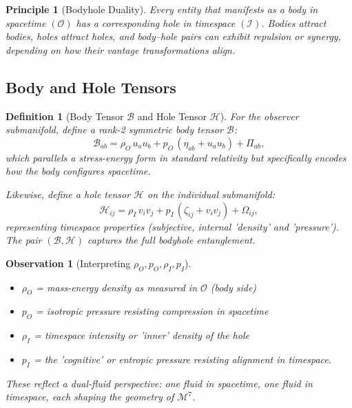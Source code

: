 \documentclass{article}
\newtheorem{definition}{Definition}
\newtheorem{observation}{Observation}
\newtheorem{principle}{Principle}
\begin{document}
\begin{principle}[Bodyhole Duality]
Every entity that manifests as a \emph{body} in spacetime $(\mathcal{O})$ has a corresponding \emph{hole} in timespace $(\mathcal{I})$. Bodies attract bodies, holes attract holes, and body--hole pairs can exhibit repulsion or synergy, depending on how their vantage transformations align.
\end{principle}

\subsection*{Body and Hole Tensors}

\begin{definition}[Body Tensor $\mathcal{B}$ and Hole Tensor $\mathcal{H}$]
For the observer submanifold, define a rank-2 symmetric \emph{body} tensor $\mathcal{B}$:
\begin{equation}
\mathcal{B}_{ab} = \rho_O\,u_a u_b + p_O\,(\eta_{ab}+u_a u_b) + \Pi_{ab},
\end{equation}
which parallels a stress-energy form in standard relativity but specifically encodes how the body configures spacetime.

Likewise, define a \emph{hole} tensor $\mathcal{H}$ on the individual submanifold:
\begin{equation}
\mathcal{H}_{ij} = \rho_I\,v_i v_j + p_I\,(\zeta_{ij} + v_i v_j) + \Omega_{ij},
\end{equation}
representing timespace properties (subjective, internal 'density' and 'pressure'). The pair $(\mathcal{B}, \mathcal{H})$ captures the full bodyhole entanglement.
\end{definition}

\begin{observation}[Interpreting $\rho_O, p_O, \rho_I, p_I$]
\begin{itemize}
  \item \(\rho_O\) = mass-energy density as measured in $\mathcal{O}$ (body side)
  \item \(p_O\) = isotropic pressure resisting compression in spacetime
  \item \(\rho_I\) = timespace intensity or 'inner' density of the hole
  \item \(p_I\) = the 'cognitive' or entropic pressure resisting alignment in timespace.
\end{itemize}
These reflect a dual-fluid perspective: one fluid in spacetime, one fluid in timespace, each shaping the geometry of $\mathcal{M}^7$.
\end{observation}
\end{document}
